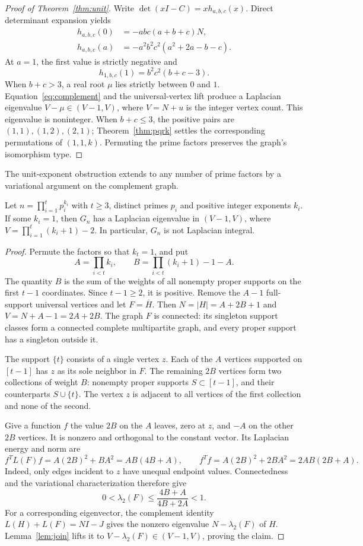 \begin{proof}[Proof of Theorem~\ref{thm:unit}]
Write $\det(xI-C)=x h_{a,b,c}(x)$. Direct determinant expansion yields
\begin{align*}
h_{a,b,c}(0)&=-abc(a+b+c)N,\\
h_{a,b,c}(a)&=-a^2b^2c^2(a^2+2a-b-c).
\end{align*}
At $a=1$, the first value is strictly negative and
\[
h_{1,b,c}(1)=b^2c^2(b+c-3).
\]
When $b+c>3$, a real root $\mu$ lies strictly between $0$ and $1$.
Equation~\eqref{eq:complement} and the universal-vertex lift produce a
Laplacian eigenvalue $V-\mu\in(V-1,V)$, where $V=N+u$ is the integer
vertex count. This eigenvalue is noninteger. When $b+c\leq3$, the
positive pairs are $(1,1),(1,2),(2,1)$; Theorem~\ref{thm:pqrk}
settles the corresponding permutations of $(1,1,k)$. Permuting the
prime factors preserves the graph's isomorphism type.
\end{proof}

The unit-exponent obstruction extends to any number of prime factors
by a variational argument on the complement graph.

\begin{theorem}
\label{thm:unit-any-prime-count}
Let $n=\prod_{i=1}^t p_i^{k_i}$ with $t\geq3$, distinct primes
$p_i$ and positive integer exponents $k_i$. If some $k_i=1$, then
$G_n$ has a Laplacian eigenvalue in $(V-1,V)$, where
$V=\prod_{i=1}^t(k_i+1)-2$. In particular, $G_n$ is not
Laplacian integral.
\end{theorem}
\begin{proof}
Permute the factors so that $k_t=1$, and put
\[
 A=\prod_{i<t}k_i,\qquad
 B=\prod_{i<t}(k_i+1)-1-A.
\]
The quantity $B$ is the sum of the weights of all nonempty proper
supports on the first $t-1$ coordinates. Since $t-1\geq2$, it is
positive. Remove the $A-1$ full-support universal vertices and let
$F=\overline H$. Then $N=|H|=A+2B+1$ and $V=N+A-1=2A+2B$.
The graph $F$ is connected: its singleton support classes form a
connected complete multipartite graph, and every proper support has
a singleton outside it.

The support $\{t\}$ consists of a single vertex $z$. Each of the
$A$ vertices supported on $[t-1]$ has $z$ as its sole neighbor in
$F$. The remaining $2B$ vertices form two collections of weight $B$:
nonempty proper supports $S\subset[t-1]$, and their counterparts
$S\cup\{t\}$. The vertex $z$ is adjacent to all vertices of the
first collection and none of the second.

Give a function $f$ the value $2B$ on the $A$ leaves, zero at $z$,
and $-A$ on the other $2B$ vertices. It is nonzero and
orthogonal to the constant vector. Its Laplacian energy and norm are
\[
 f^TL(F)f=A(2B)^2+BA^2=AB(4B+A),\qquad
 f^Tf=A(2B)^2+2BA^2=2AB(2B+A).
\]
Indeed, only edges incident to $z$ have unequal endpoint values.
Connectedness and the variational characterization therefore give
\[
 0<\lambda_2(F)\leq\frac{4B+A}{4B+2A}<1.
\]
For a corresponding eigenvector, the complement identity
$L(H)+L(F)=NI-J$ gives the nonzero eigenvalue $N-\lambda_2(F)$
of $H$. Lemma~\ref{lem:join} lifts it to
$V-\lambda_2(F)\in(V-1,V)$, proving the claim.
\end{proof}


